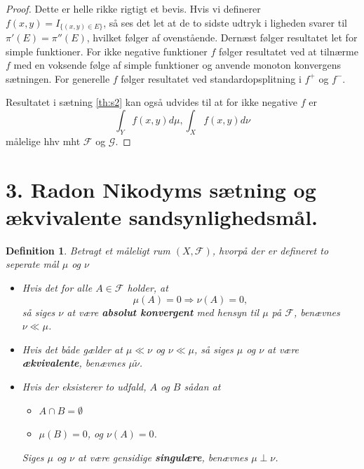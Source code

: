 \documentclass[12pt]{report}
\newtheorem{definition}[lemma]{Definition}
\theoremstyle{break}
\newtheorem*{proof}{Bevis}
\theoremstyle{break}
\newcommand{\G}{\mathcal{G}}
\newcommand{\FI}{\mathcal{F}}
\begin{document}
\begin{proof}
	Dette er helle rikke rigtigt et bevis. Hvis vi definerer $f(x,y)=I_{\{ (x,y)\in E \}}$, så ses det let at de to sidste udtryk i ligheden svarer til $\pi'(E)=\pi''(E)$, hvilket følger af ovenstående. Dernæst følger resultatet let for simple funktioner. For ikke negative funktioner $f$ følger resultatet ved at tilnærme $f$ med en voksende følge af simple funktioner og anvende monoton konvergens sætningen. For generelle $f$ følger resultatet ved standardopsplitning i $f^+$ og $f^-$.
	
	Resultatet i sætning \ref{th:s2} kan også udvides til at for ikke negative $f$ er
	\[ \int_Y f(x,y)d\mu, \int_Xf(x,y)d\nu \]
	målelige hhv mht $\FI$ og $\G$.
\end{proof}
\newpage
\section*{3. Radon Nikodyms sætning og ækvivalente sandsynlighedsmål.}
\begin{definition}
	Betragt et måleligt rum $(X,\FI)$, hvorpå der er defineret to seperate mål $\mu$ og $\nu$
	\begin{itemize}
		\item Hvis det for alle $A\in \FI$ holder, at
		\[ \mu(A)=0 \Rightarrow\nu(A)=0, \]
		så siges $\nu$ at være {\bf absolut konvergent} med hensyn til $\mu$ på $\FI$, benævnes $\nu \ll \mu$.
		\item Hvis det både gælder at $\mu \ll \nu$ og $\nu \ll \mu$, så siges $\mu$ og $\nu$ at være {\bf ækvivalente}, benævnes $\mu \tilde \nu$.
		\item Hvis der eksisterer to udfald, $A$ og $B$ sådan at
		\begin{itemize}
			\item $A\cap B=\emptyset$
			\item $\mu(B)=0$, og $\nu(A)=0$.
		\end{itemize}
		Siges $\mu$ og $\nu$ at være gensidige {\bf singulære}, benævnes $\mu \perp \nu$.
		
	\end{itemize}
\end{definition}
\end{document}
